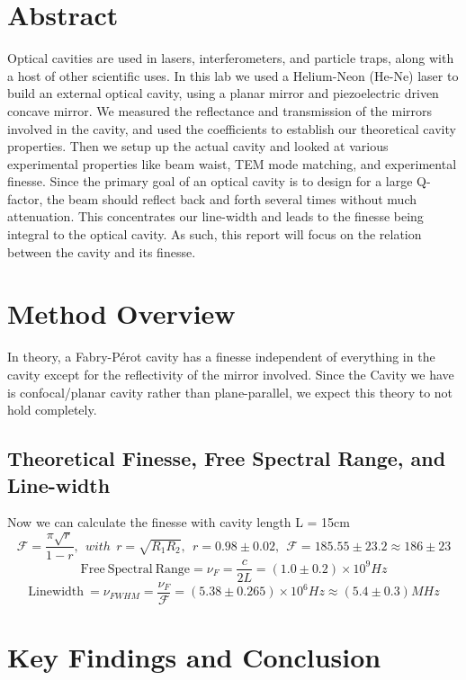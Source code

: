 \documentclass[11pt]{article}
\begin{document}
\section{Abstract}
Optical cavities are used in lasers, interferometers, and particle traps, along with a host of other scientific uses. In this lab we used a Helium-Neon (He-Ne) laser to build an external optical cavity, using a planar mirror and piezoelectric driven concave mirror. We measured the reflectance and transmission of the mirrors involved in the cavity, and used the coefficients to establish our theoretical cavity properties. Then we setup up the actual cavity and looked at various experimental properties like beam waist, TEM mode matching, and experimental finesse. Since the primary goal of an optical cavity is to design for a large Q-factor, the beam should reflect back and forth several times without much attenuation. This concentrates our line-width and leads to the finesse being integral to the optical cavity. As such, this report will focus on the relation between the cavity and its finesse. 
\section{Method Overview}
In theory, a Fabry-Pérot cavity has a finesse independent of everything in the cavity except for the reflectivity of the mirror involved. Since the Cavity we have is confocal/planar cavity rather than plane-parallel, we expect this theory to not hold completely. 
\subsection{Theoretical Finesse, Free Spectral Range, and Line-width}

Now we can calculate the finesse with cavity length L = 15cm 
$$\mathscr{F} = \frac{\pi\sqrt{r}}{1-r},\ \ with \ \ r = \sqrt{R_1R_2} ,\ \  r = 0.98 \pm 0.02,\ \  \mathscr{F} = 185.55 \pm 23.2 \approx 186 \pm 23 $$
$$ \mathrm{Free\ Spectral\ Range} = \nu_F = \frac{c}{2L} = (1.0 \pm 0.2)\times 10^9 Hz $$
$$\mathrm{Linewidth}\ = \nu_{FWHM} = \frac{\nu_F}{\mathscr{F}} = (5.38 \pm 0.265 )\times 10^6 Hz \approx (5.4\pm0.3)MHz $$

\section{Key Findings and Conclusion}
\end{document}
